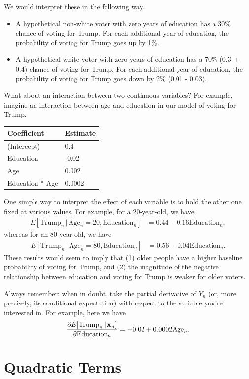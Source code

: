 \documentclass[12pt,oneside,openany]{book}
\begin{document}
We would interpret these in the following way.

\begin{itemize}
\item
  A hypothetical non-white voter with zero years of education has a 30\%
  chance of voting for Trump. For each additional year of education, the
  probability of voting for Trump goes up by 1\%.
\item
  A hypothetical white voter with zero years of education has a 70\%
  (0.3 + 0.4) chance of voting for Trump. For each additional year of
  education, the probability of voting for Trump goes down by 2\% (0.01
  - 0.03).
\end{itemize}

What about an interaction between two continuous variables? For example,
imagine an interaction between age and education in our model of voting
for Trump.

\begin{longtable}[]{@{}ll@{}}
\toprule
Coefficient & Estimate\tabularnewline
\midrule
\endhead
(Intercept) & 0.4\tabularnewline
Education & -0.02\tabularnewline
Age & 0.002\tabularnewline
Education * Age & 0.0002\tabularnewline
\bottomrule
\end{longtable}

One simple way to interpret the effect of each variable is to hold the
other one fixed at various values. For example, for a 20-year-old, we
have \[
\begin{aligned}
E[\text{Trump}_n \,|\, \text{Age}_n = 20, \text{Education}_n] &= 0.44 - 0.16 \text{Education}_n,
\end{aligned}
\] whereas for an 80-year-old, we have \[
\begin{aligned}
E[\text{Trump}_n \,|\, \text{Age}_n = 80, \text{Education}_n] &= 0.56 - 0.04 \text{Education}_n.
\end{aligned}
\] These results would seem to imply that (1) older people have a higher
baseline probability of voting for Trump, and (2) the magnitude of the
negative relationship between education and voting for Trump is weaker
for older voters.

Always remember: when in doubt, take the partial derivative of \(Y_n\)
(or, more precisely, its conditional expectation) with respect to the
variable you're interested in. For example, here we have \[
\frac{\partial{}E[\text{Trump}_n \,|\, \mathbf{x}_n]}{\partial{}\text{Education}_n} = -0.02 + 0.0002 \text{Age}_n.
\]

\section{Quadratic Terms}\label{quadratic-terms}
\end{document}
